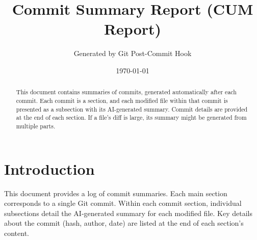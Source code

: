 \documentclass{article}
\title{Commit Summary Report (CUM Report)}
\author{Generated by Git Post-Commit Hook}
\date{\today}
\begin{document}
\maketitle
\begin{abstract}
This document contains summaries of commits, generated automatically after each commit. Each commit is a section, and each modified file within that commit is presented as a subsection with its AI-generated summary. Commit details are provided at the end of each section. If a file's diff is large, its summary might be generated from multiple parts.
\end{abstract}
\tableofcontents
\newpage

\section{Introduction}
This document provides a log of commit summaries. Each main section corresponds to a single Git commit. Within each commit section, individual subsections detail the AI-generated summary for each modified file. Key details about the commit (hash, author, date) are listed at the end of each section's content.
\end{document}
